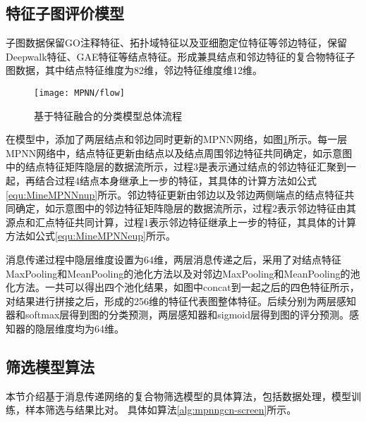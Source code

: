 \subsection{特征子图评价模型}
子图数据保留GO注释特征、拓扑域特征以及亚细胞定位特征等邻边特征，保留Deepwalk特征、GAE特征等结点特征。形成兼具结点和邻边特征的复合物特征子图数据，其中结点特征维度为82维，邻边特征维度维12维。

\begin{figure}[htbp]
    \centering
    \texttt{[image: MPNN/flow]}
    \caption{基于特征融合的分类模型总体流程}
    \label{fig:MPNN/flow}
\end{figure}

在模型中，添加了两层结点和邻边同时更新的MPNN网络，如图\ref{fig:MPNN/flow}所示。每一层MPNN网络中，结点特征更新由结点以及结点周围邻边特征共同确定，如示意图中的结点特征矩阵隐层的数据流所示，过程3是表示通过结点的邻边特征汇聚到一起，再结合过程4结点本身继承上一步的特征，其具体的计算方法如公式\ref{equ:MineMPNNnup}所示。邻边特征更新由邻边以及邻边两侧端点的结点特征共同确定，如示意图中的邻边特征矩阵隐层的数据流所示，过程2表示邻边特征由其源点和汇点特征共同计算，过程1表示邻边特征继承上一步的特征，其具体的计算方法如公式\ref{equ:MineMPNNeup}所示。

消息传递过程中隐层维度设置为64维，两层消息传递之后，采用了对结点特征MaxPooling和MeanPooling的池化方法以及对邻边MaxPooling和MeanPooling的池化方法。一共可以得出四个池化结果，如图中concat到一起之后的四色特征所示，对结果进行拼接之后，形成的256维的特征代表图整体特征。后续分别为两层感知器和softmax层得到图的分类预测，两层感知器和sigmoid层得到图的评分预测。感知器的隐层维度均为64维。

\subsection{筛选模型算法}
本节介绍基于消息传递网络的复合物筛选模型的具体算法，包括数据处理，模型训练，样本筛选与结果比对。
具体如算法\ref{alg:mpnngcn-screen}所示。

